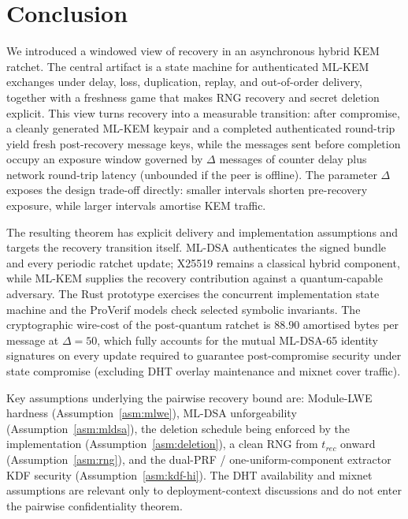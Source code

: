 \documentclass[11pt,a4paper]{article}
\theoremstyle{remark}
\theoremstyle{plain}
\begin{document}
\section{Conclusion}
\label{sec:conclusion}

We introduced a windowed view of recovery in an asynchronous hybrid KEM ratchet.  The central
artifact is a state machine for authenticated ML-KEM exchanges under delay, loss, duplication,
replay, and out-of-order delivery, together with a freshness game that makes RNG recovery and
secret deletion explicit.  This view turns recovery into a measurable transition: after
compromise, a cleanly generated ML-KEM keypair and a completed authenticated round-trip yield
fresh post-recovery message keys, while the messages sent before completion occupy an exposure window
governed by $\Delta$ messages of counter delay plus network round-trip latency (unbounded if the peer is offline).
The parameter $\Delta$ exposes the design trade-off directly:
smaller intervals shorten pre-recovery exposure, while larger intervals amortise KEM traffic.

The resulting theorem has explicit delivery and implementation assumptions and targets the
recovery transition itself.  ML-DSA authenticates the signed bundle and every periodic ratchet update;
X25519 remains a classical hybrid component, while ML-KEM supplies the recovery contribution
against a quantum-capable adversary.  The Rust prototype exercises the concurrent implementation
state machine and the ProVerif models check selected symbolic invariants.  The cryptographic
wire-cost of the post-quantum ratchet is $88.90$ amortised bytes per message at $\Delta=50$,
which fully accounts for the mutual ML-DSA-65 identity signatures on every update required to
guarantee post-compromise security under state compromise (excluding DHT overlay maintenance
and mixnet cover traffic).

Key assumptions underlying the pairwise recovery bound are: Module-LWE hardness
(Assumption~\ref{asm:mlwe}), ML-DSA unforgeability (Assumption~\ref{asm:mldsa}), the deletion
schedule being enforced by the implementation (Assumption~\ref{asm:deletion}), a clean RNG from
$t_{rec}$ onward (Assumption~\ref{asm:rng}), and the dual-PRF / one-uniform-component extractor
KDF security (Assumption~\ref{asm:kdf-hi}).  The DHT availability and mixnet assumptions are relevant only
to deployment-context discussions and do not enter the pairwise confidentiality theorem.
\end{document}
